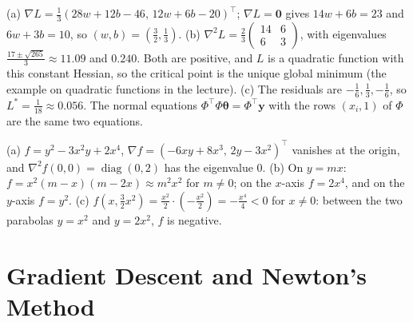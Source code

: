 \documentclass[11pt]{article}
\DeclareMathOperator{\diag}{diag}
\begin{document}
\begin{description}[leftmargin=0pt, itemsep=0.3em]
    \item[\ref{pr:ls-calculus}.] (a) $\nabla L = \frac{1}{3}(28w + 12b - 46, \, 12w + 6b - 20)^\top$; $\nabla L = \mathbf{0}$ gives $14w + 6b = 23$ and $6w + 3b = 10$, so $(w, b) = (\frac{3}{2}, \frac{1}{3})$. (b) $\nabla^2 L = \frac{2}{3}\begin{pmatrix} 14 & 6 \\ 6 & 3 \end{pmatrix}$, with eigenvalues $\frac{17 \pm \sqrt{265}}{3} \approx 11.09$ and $0.240$. Both are positive, and $L$ is a quadratic function with this constant Hessian, so the critical point is the unique global minimum (the example on quadratic functions in the lecture). (c) The residuals are $-\frac{1}{6}, \frac{1}{3}, -\frac{1}{6}$, so $L^* = \frac{1}{18} \approx 0.056$. The normal equations $\Phi^\top\Phi\boldsymbol{\theta} = \Phi^\top\mathbf{y}$ with the rows $(x_i, 1)$ of $\Phi$ are the same two equations.
    \item[\ref{pr:peano}.] (a) $f = y^2 - 3x^2 y + 2x^4$, $\nabla f = (-6xy + 8x^3, \, 2y - 3x^2)^\top$ vanishes at the origin, and $\nabla^2 f(0, 0) = \diag(0, 2)$ has the eigenvalue $0$. (b) On $y = mx$: $f = x^2(m - x)(m - 2x) \approx m^2 x^2$ for $m \neq 0$; on the $x$-axis $f = 2x^4$, and on the $y$-axis $f = y^2$. (c) $f(x, \frac{3}{2}x^2) = \frac{x^2}{2} \cdot (-\frac{x^2}{2}) = -\frac{x^4}{4} < 0$ for $x \neq 0$: between the two parabolas $y = x^2$ and $y = 2x^2$, $f$ is negative.
\end{description}

\section*{Gradient Descent and Newton's Method}
\end{document}
